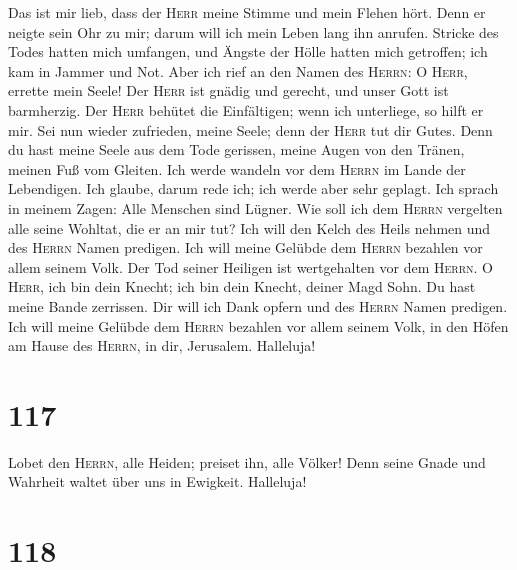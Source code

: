  Das ist mir lieb, dass der \textsc{Herr} meine Stimme und
mein Flehen hört.  Denn er neigte sein Ohr zu mir; darum
will ich mein Leben lang ihn anrufen.  Stricke des Todes
hatten mich umfangen, und Ängste der Hölle hatten mich getroffen; ich
kam in Jammer und Not.  Aber ich rief an den Namen des
\textsc{Herrn}: O \textsc{Herr}, errette mein Seele!  Der
\textsc{Herr} ist gnädig und gerecht, und unser Gott ist barmherzig.
 Der \textsc{Herr} behütet die Einfältigen; wenn ich
unterliege, so hilft er mir.  Sei nun wieder zufrieden,
meine Seele; denn der \textsc{Herr} tut dir Gutes.  Denn
du hast meine Seele aus dem Tode gerissen, meine Augen von den Tränen,
meinen Fuß vom Gleiten.  Ich werde wandeln vor dem
\textsc{Herrn} im Lande der Lebendigen.  Ich glaube,
darum rede ich; ich werde aber sehr geplagt.  Ich sprach
in meinem Zagen: Alle Menschen sind Lügner.  Wie soll ich
dem \textsc{Herrn} vergelten alle seine Wohltat, die er an mir tut?
 Ich will den Kelch des Heils nehmen und des
\textsc{Herrn} Namen predigen.  Ich will meine Gelübde
dem \textsc{Herrn} bezahlen vor allem seinem Volk.  Der
Tod seiner Heiligen ist wertgehalten vor dem \textsc{Herrn}.
 O \textsc{Herr}, ich bin dein Knecht; ich bin dein
Knecht, deiner Magd Sohn. Du hast meine Bande zerrissen. 
Dir will ich Dank opfern und des \textsc{Herrn} Namen predigen.
 Ich will meine Gelübde dem \textsc{Herrn} bezahlen vor
allem seinem Volk,  in den Höfen am Hause des
\textsc{Herrn}, in dir, Jerusalem. Halleluja!

\hypertarget{section-116}{%
\section{117}\label{section-116}}

 Lobet den \textsc{Herrn}, alle Heiden; preiset ihn, alle
Völker!  Denn seine Gnade und Wahrheit waltet über uns in
Ewigkeit. Halleluja!

\hypertarget{section-117}{%
\section{118}\label{section-117}}

